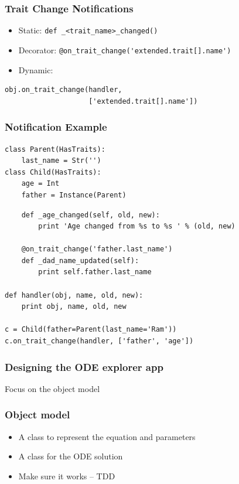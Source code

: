 \documentclass[14pt,compress]{beamer}
\newcommand{\typ}[1]{\lstinline{#1}}
\newcommand{\myemph}[1]{\structure{\emph{#1}}}
\begin{document}
\begin{frame}
    \frametitle{Trait Change Notifications}
    \vspace*{-6pt}
    \small
    \begin{itemize}
        \item Static: \typ{def _<trait_name>_changed()}
        \item Decorator: \typ{@on_trait_change('extended.trait[].name')}
        \item Dynamic:
    \end{itemize}
\begin{lstlisting}
obj.on_trait_change(handler, 
                    ['extended.trait[].name'])
\end{lstlisting}
\end{frame}

\begin{frame}
  \frametitle{Notification Example}
\vspace*{-8pt}
\footnotesize
\begin{lstlisting}
class Parent(HasTraits):
    last_name = Str('') 
class Child(HasTraits):
    age = Int
    father = Instance(Parent)
\end{lstlisting}
\pause
\begin{lstlisting}
    def _age_changed(self, old, new):
        print 'Age changed from %s to %s ' % (old, new)

    @on_trait_change('father.last_name')
    def _dad_name_updated(self):
        print self.father.last_name

def handler(obj, name, old, new):
    print obj, name, old, new

c = Child(father=Parent(last_name='Ram'))
c.on_trait_change(handler, ['father', 'age'])
\end{lstlisting}
\end{frame}


\begin{frame}
  \frametitle{Designing the ODE explorer app}
  \Large
\begin{center}
    \myemph{Think!}
    \pause

    \vspace*{1in}
    Focus on the object model
\end{center}
\end{frame}

\begin{frame}
  \frametitle{Object model}
  \begin{itemize}
      \item A class to represent the equation and parameters
      \item A class for the ODE solution
      \item Make sure it works -- TDD
 \end{itemize}
\end{frame}
\end{document}
